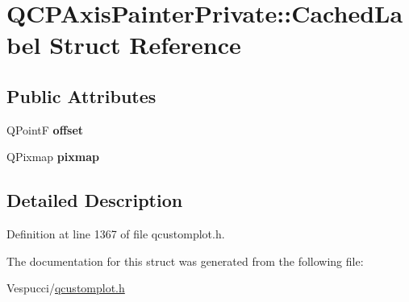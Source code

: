 \hypertarget{struct_q_c_p_axis_painter_private_1_1_cached_label}{}\section{Q\+C\+P\+Axis\+Painter\+Private\+:\+:Cached\+Label Struct Reference}
\label{struct_q_c_p_axis_painter_private_1_1_cached_label}
\subsection*{Public Attributes}
\begin{DoxyCompactItemize}
\item 
Q\+PointF {\bfseries offset}\hypertarget{struct_q_c_p_axis_painter_private_1_1_cached_label_a5f502db71c92e572f1e6f44f62c59d8e}{}\label{struct_q_c_p_axis_painter_private_1_1_cached_label_a5f502db71c92e572f1e6f44f62c59d8e}

\item 
Q\+Pixmap {\bfseries pixmap}\hypertarget{struct_q_c_p_axis_painter_private_1_1_cached_label_a461597cbd470914a9d24b64d16037a88}{}\label{struct_q_c_p_axis_painter_private_1_1_cached_label_a461597cbd470914a9d24b64d16037a88}

\end{DoxyCompactItemize}


\subsection{Detailed Description}


Definition at line 1367 of file qcustomplot.\+h.



The documentation for this struct was generated from the following file\+:\begin{DoxyCompactItemize}
\item 
Vespucci/\hyperlink{qcustomplot_8h}{qcustomplot.\+h}\end{DoxyCompactItemize}
